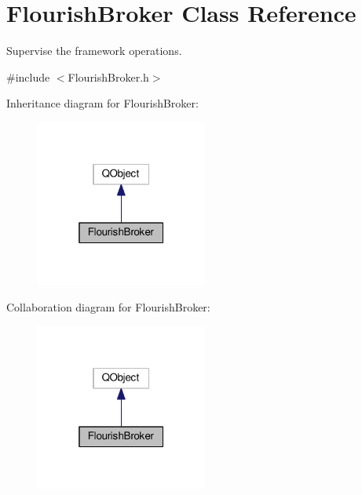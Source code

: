 \hypertarget{classFlourishBroker}{}\section{Flourish\+Broker Class Reference}
\label{classFlourishBroker}


Supervise the framework operations.  




{\ttfamily \#include $<$Flourish\+Broker.\+h$>$}



Inheritance diagram for Flourish\+Broker\+:\nopagebreak
\begin{figure}[H]
\begin{center}
\leavevmode
\includegraphics[width=160pt]{classFlourishBroker__inherit__graph}
\end{center}
\end{figure}


Collaboration diagram for Flourish\+Broker\+:\nopagebreak
\begin{figure}[H]
\begin{center}
\leavevmode
\includegraphics[width=160pt]{classFlourishBroker__coll__graph}
\end{center}
\end{figure}

